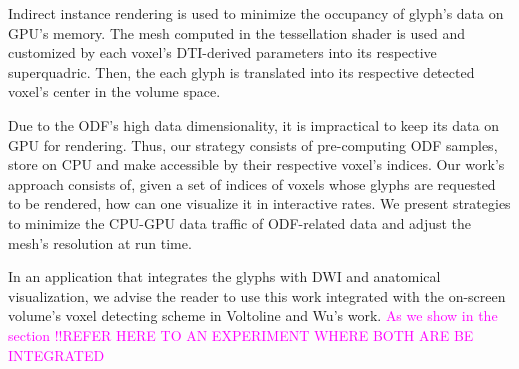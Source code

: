 \documentclass[twoside,twocolumn,10pt]{article}
\begin{document}
Indirect instance rendering is used to minimize the occupancy of glyph's data on GPU's memory. The mesh computed in the tessellation shader is used and customized by each voxel's DTI-derived parameters into its respective superquadric. Then, the each glyph is translated into its respective detected voxel's center in the volume space.











Due to the ODF's high data dimensionality, it is impractical to keep its data on GPU for rendering. Thus, our strategy consists of pre-computing ODF samples, store on CPU and make accessible by their respective voxel's indices. Our work's approach consists of, given a set of indices of voxels whose glyphs are requested to be rendered, how can one visualize it in interactive rates. We present strategies to minimize the CPU-GPU data traffic of ODF-related data and adjust the mesh's resolution at run time.%


In an application that integrates the glyphs with DWI and anatomical visualization, we advise the reader to use this work integrated with the on-screen volume's voxel detecting scheme in Voltoline and Wu's \cite{voltoline2021} work. \textcolor{magenta}{As we show in the section !!REFER HERE TO AN EXPERIMENT WHERE BOTH ARE BE INTEGRATED}



\end{document}
